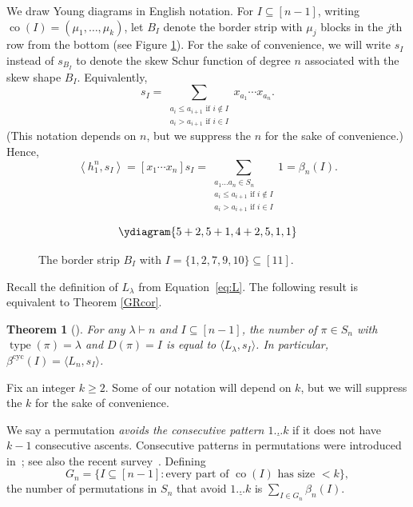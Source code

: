 \documentclass[12pt]{article}
\newcommand{\Perm}{S}
\newcommand{\betacyc}{\beta^{\text{cyc}}}
\DeclareMathOperator{\type}{type}
\DeclareMathOperator{\co}{co}
\newtheorem{thm}{Theorem}[section]
\theoremstyle{definition}
\begin{document}
We draw Young diagrams in English notation. For $I \subseteq [n-1]$, writing $\co(I) = (\mu_1, \ldots, \mu_k)$, let $B_I$ denote the border strip with $\mu_j$ blocks in the $j$th row from the bottom (see Figure \ref{example}).
For the sake of convenience, we will write $s_I$ instead of $s_{B_I}$ to denote the skew Schur function of degree $n$ associated with the skew shape $B_I$. Equivalently,
\[ s_I = \sum_{\substack{a_i \le a_{i+1} \text{ if } i \not\in I \\ a_i > a_{i+1} \text{ if } i \in I}} x_{a_1} \cdots x_{a_n}. \]
(This notation depends on $n$, but we suppress the $n$ for the sake of convenience.) Hence,
\begin{equation}
\left\langle h_1^n, s_I \right\rangle = [x_1\cdots x_n] s_I = \sum_{\substack{a_1 \ldots a_n \in S_n \\ a_i \le a_{i+1} \text{ if } i \not\in I \\ a_i > a_{i+1} \text{ if } i \in I}} 1
= \beta_n(I). \label{eq:sI}
\end{equation}

\begin{figure}[b]
\[ \ydiagram{5+2,5+1,4+2,5,1,1} \]
\caption{\label{example}The border strip $B_I$ with $I = \{1, 2, 7, 9, 10\} \subseteq [11]$.}
\end{figure}

Recall the definition of $L_\lambda$ from Equation~\eqref{eq:L}. The following result is equivalent to Theorem \ref{GRcor}. 

\begin{thm}[{\cite[Thm.\ 2.1]{GR}}]\label{GRmain} For any $\lambda \vdash n$ and $I \subseteq [n-1]$, the number of $\pi \in \Perm_n$ with $\type(\pi) = \lambda$ and $D(\pi) = I$ is equal to $\langle L_\lambda, s_{I}\rangle$. In particular, $\betacyc(I) = \langle L_n, s_{I}\rangle$.
\end{thm}

Fix an integer $k \ge 2$. Some of our notation will depend on $k$, but we will suppress the $k$ for the sake of convenience.

We say a permutation \emph{avoids the consecutive pattern $\underline{1\dots k}$} if it does not have $k-1$ consecutive ascents. 
Consecutive patterns in permutations were introduced in~\cite{EliNoy}; see also the recent survey~\cite{Eli_survey}.
Defining
\[ G_n = \{I \subseteq [n-1] \colon \text{every part of $\co(I)$ has size $< k$}\}, \]
the number of permutations in $\Perm_n$ that avoid $\underline{1\dots k}$ is $\sum_{I \in G_n} \beta_n(I)$.
\end{document}
